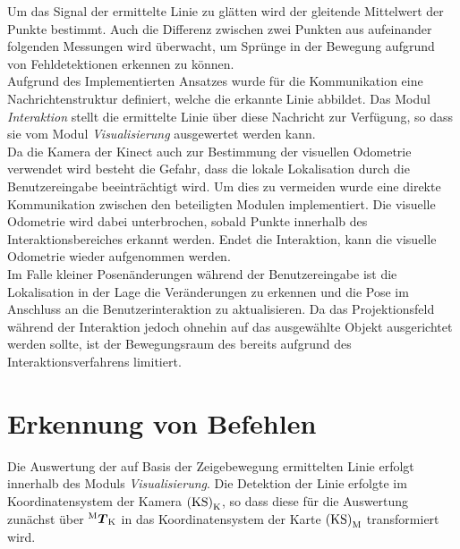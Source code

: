 Um das Signal der ermittelte Linie zu glätten wird der gleitende Mittelwert der Punkte bestimmt. Auch die Differenz zwischen zwei Punkten aus aufeinander folgenden Messungen wird überwacht, um Sprünge in der Bewegung aufgrund von Fehldetektionen erkennen zu können.\\
Aufgrund des Implementierten Ansatzes wurde für die Kommunikation eine Nachrichtenstruktur definiert, welche die erkannte Linie abbildet. Das Modul \textit{Interaktion} stellt die ermittelte Linie über diese Nachricht zur Verfügung, so dass sie vom Modul \textit{Visualisierung} ausgewertet werden kann.\\

Da die Kamera der Kinect auch zur Bestimmung der visuellen Odometrie verwendet wird besteht die Gefahr, dass die lokale Lokalisation durch die Benutzereingabe beeinträchtigt wird. Um dies zu vermeiden wurde eine direkte Kommunikation zwischen den beteiligten Modulen implementiert. Die visuelle Odometrie wird dabei unterbrochen, sobald Punkte innerhalb des Interaktionsbereiches erkannt werden. Endet die Interaktion, kann die visuelle Odometrie wieder aufgenommen werden.\\
Im Falle kleiner Posenänderungen während der Benutzereingabe ist die Lokalisation in der Lage die Veränderungen zu erkennen und die Pose im Anschluss an die Benutzerinteraktion zu aktualisieren. Da das Projektionsfeld während der Interaktion jedoch ohnehin auf das ausgewählte Objekt ausgerichtet werden sollte, ist der Bewegungsraum des  bereits aufgrund des Interaktionsverfahrens limitiert.\\

\section{Erkennung von Befehlen}
Die Auswertung der auf Basis der Zeigebewegung ermittelten Linie erfolgt innerhalb des Moduls \textit{Visualisierung}. Die Detektion der Linie erfolgte im Koordinatensystem der Kamera ${\mathrm{(KS)}}_{\mathrm{K}}$, so dass diese für die Auswertung zunächst über ${^{\mathrm{M}}\mbox{\boldmath{$T$}}_{\mathrm{K}}}$ in das Koordinatensystem der Karte ${\mathrm{(KS)}}_{\mathrm{M}}$ transformiert wird.\\

